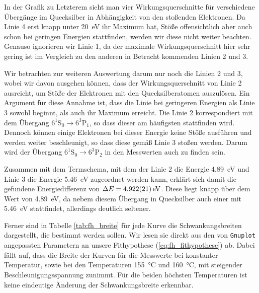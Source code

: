 \documentclass[11pt, a4paper]{article}
\begin{document}
In der Grafik zu Letzterem sieht man vier Wirkungsquerschnitte für verschiedene Übergänge im Quecksilber in Abhängigkeit von den stoßenden Elektronen.
Da Linie 4 erst knapp unter \SI{20}{\electronvolt} ihr Maximum hat, Stöße offensichtlich aber auch schon bei geringen Energien stattfinden, werden wir diese nicht weiter beachten.
Genauso ignorieren wir Linie 1, da der maximale Wirkungsquerschnitt hier sehr gering ist im Vergleich zu den anderen in Betracht kommenden Linien 2 und 3.

Wir betrachten zur weiteren Auswertung darum nur noch die Linien 2 und 3, wobei wir davon ausgehen können, dass der Wirkungsquerschnitt von Linie 2 ausreicht, um Stöße der Elektronen mit den Quecksilberatomen auszulösen.
Ein Argument für diese Annahme ist, dass die Linie bei geringeren Energien als Linie 3 sowohl beginnt, als auch ihr Maximum erreicht.
Die Linie 2 korrespondiert mit dem Übergang $6^1$S$_0\rightarrow6^3$P$_1$, so dass dieser am häufigsten stattfinden wird.
Dennoch können einige Elektronen bei dieser Energie keine Stöße ausführen und werden weiter beschleunigt, so dass diese gemäß Linie 3 stoßen werden.
Darum wird der Übergang $6^1$S$_0\rightarrow6^3$P$_2$ in den Messwerten auch zu finden sein.

Zusammen mit dem Termschema, mit dem der Linie 2 die Energie \SI{4.89}{\electronvolt} und Linie 3 die Energie \SI{5.46}{\electronvolt} zugeordnet werden kann, erklärt sich damit die gefundene Energiedifferenz von $\Delta E = \SI{4.922+-0.021}{\electronvolt}$.
Diese liegt knapp über dem Wert von \SI{4.89}{\electronvolt}, da nebem diesem Übergang in Quecksilber auch einer mit \SI{5.46}{\electronvolt} stattfindet, allerdings deutlich seltener.

\begin{table}[h]
\centering

\caption{Messwerte der Schwankungsbreite für variable $\Delta U$ bei \SI{160}{\degreeCelsius} bzw. variable Temperatur bei $\Delta U=\SI{2}{\volt}$}
\label{tab:fh_breite}
\end{table}
Ferner sind in Tabelle \ref{tab:fh_breite} für jede Kurve die Schwankungsbreiten dargestellt, die bestimmt werden sollen.
Wir lesen sie direkt aus den von \texttt{Gnuplot} angepassten Parametern an unsere Fithypothese (\ref{eq:fh_fithypothese}) ab.
Dabei fällt auf, dass die Breite der Kurven für die Messwerte bei konstanter Temperatur, sowie bei den Temperaturen \SI{155}{\degreeCelsius} und \SI{160}{\degreeCelsius}, mit steigender Beschleunigungsspannung zunimmt.
Für die beiden höchsten Temperaturen ist keine eindeutige Änderung der Schwankungsbreite erkennbar.
\end{document}
